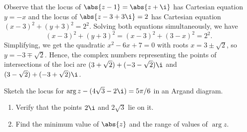 \begin{solution}
    Observe that the locus of $\abs{z - 1} = \abs{z + \i}$ has Cartesian equation $y = -x$ and the locus of $\abs{z - 3 + 3\i} = 2$ has Cartesian equation $(x-3)^2 + (y+3)^2 = 2^2$. Solving both equations simultaneously, we have \[(x-3)^2 + (y+3)^2 = (x-3)^2 + (3-x)^2 = 2^2.\] Simplifying, we get the quadratic $x^2 - 6x + 7 = 0$ with roots $x = 3 \pm \sqrt2$, so $y = -3 \mp \sqrt2$. Hence, the complex numbers representing the points of intersections of the loci are $(3 + \sqrt2) + (-3 - \sqrt2)\i$ and $(3 - \sqrt2) + (-3 + \sqrt2)\i$.
\end{solution}

\begin{problem}
    Sketch the locus for $\arg{z - (4\sqrt3 - 2\i)} = 5\pi/6$ in an Argand diagram.

    \begin{enumerate}
        \item Verify that the points $2\i$ and $2\sqrt3$ lie on it.
        \item Find the minimum value of $\abs{z}$ and the range of values of $\arg{z}$.
    \end{enumerate}
\end{problem}
